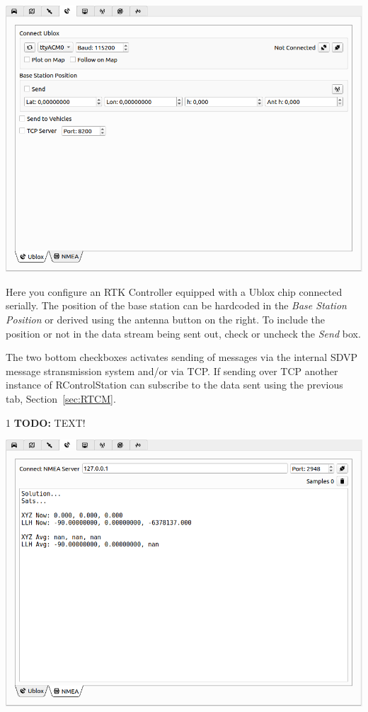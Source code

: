\documentclass[12pt]{article} %
\def\printtodos{0}
\newcommand{\todo}[1]{
  \if\printtodos1
      {\color{red} \textbf{TODO:} #1}
  \fi}
\begin{document}
\noindent\begin{minipage}{0.5\linewidth}
\noindent \includegraphics[width=\textwidth]{./screens/base_station_UBLOX.png}
\end{minipage}
\begin{minipage}{0.5\linewidth}
  Here you configure an RTK Controller equipped with a Ublox chip
  connected serially.  The position of the base station can be
  hardcoded in the {\em Base Station Position} or derived using the
  antenna button on the right. To include the position or not in the
  data stream being sent out, check or uncheck the {\em Send} box.

  The two bottom checkboxes activates sending of messages via the
  internal SDVP message stransmission system and/or via TCP. If
  sending over TCP another instance of RControlStation can subscribe
  to the data sent using the previous tab, Section~\ref{sec:RTCM}.
\end{minipage}

\noindent\begin{minipage}{0.5\linewidth}
  \todo{TEXT!}
\end{minipage}
\begin{minipage}{0.5\linewidth}
\noindent \includegraphics[width=\textwidth]{./screens/base_station_NMEA.png}
\end{minipage}
\end{document}
